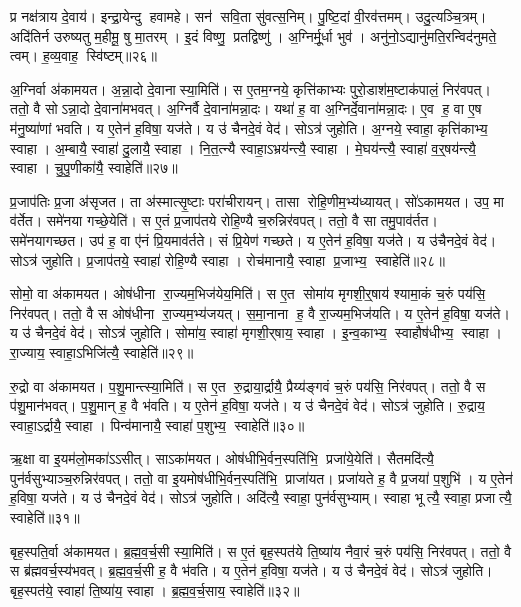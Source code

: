 प्र नक्ष॑त्राय दे॒वाय॑।
इन्द्रा॒येन्दु हवामहे।
सन॑ सवि॒ता सु॑वत्स॒निम्।
पु॒ष्टि॒दां वी॒रव॑त्तमम्।
उदु॒त्यञ्चि॒त्रम्।
अदि॑तिर्न उरुष्यतु म॒हीमू॒ षु मा॒तरम्।
इ॒दं विष्णु॒ प्रतद्विष्णु॑।
अ॒ग्निर्मू॒र्धा भुव॑।
अनु॑नो॒ऽद्यानु॑मति॒रन्विद॑नुमते॒ त्वम्।
ह॒व्य॒वाह॒ स्वि॑ष्टम्॥२६॥\anuvakamend[आ॒य॒त्य॑गम॒त्स्वि॑ष्टम्]

अ॒ग्निर्वा अ॑कामयत।
अ॒न्ना॒दो दे॒वानास्या॒मिति॑।
स ए॒तम॒ग्नये॒ कृत्ति॑काभ्यः पुरो॒डाश॑म॒ष्टाक॑पालं॒ निर॑वपत्।
ततो॒ वै सोऽन्ना॒दो दे॒वाना॑मभवत्।
अ॒ग्निर्वै दे॒वाना॑मन्ना॒दः।
यथा॑ ह॒ वा अ॒ग्निर्दे॒वाना॑मन्ना॒दः।
ए॒व ह॒ वा ए॒ष म॑नु॒ष्या॑णां भवति।
य ए॒तेन॑ ह॒विषा॒ यज॑ते।
य उ॑ चैनदे॒वं वेद॑।
सोऽत्र॑ जुहोति।
अ॒ग्नये॒ स्वाहा॒ कृत्ति॑काभ्य॒ स्वाहा।
अ॒म्बायै॒ स्वाहा॑ दु॒लायै॒ स्वाहा।
नि॒त॒त्न्यै स्वाहा॒ऽभ्रय॑न्त्यै॒ स्वाहा।
मे॒घय॑न्त्यै॒ स्वाहा॑ व॒र्॒षय॑न्त्यै॒ स्वाहा।
चु॒पु॒णीका॑यै॒ स्वाहेति॑॥२७॥

प्र॒जाप॑तिः प्र॒जा अ॑सृजत।
ता अ॑स्मात्सृ॒ष्टाः परा॑चीरायन्।
तासा रोहि॒णीम॒भ्य॑ध्यायत्।
सो॑ऽकामयत।
उप॒ मा व॑र्तेत।
समे॑नया गच्छे॒येति॑।
स ए॒तं प्र॒जाप॑तये रोहि॒ण्यै च॒रुन्निर॑वपत्।
ततो॒ वै सा तमु॒पाव॑र्तत।
समे॑नयागच्छत।
उप॑ ह॒ वा ए॑नं प्रि॒यमाव॑र्तते।
सं प्रि॒येण॑ गच्छते।
य ए॒तेन॑ ह॒विषा॒ यज॑ते।
य उ॑चैनदे॒वं वेद॑।
सोऽत्र॑ जुहोति।
प्र॒जाप॑तये॒ स्वाहा॑ रोहि॒ण्यै स्वाहा।
रोच॑मानायै॒ स्वाहा प्र॒जाभ्य॒ स्वाहेति॑॥२८॥

सोमो॒ वा अ॑कामयत।
ओष॑धीना रा॒ज्यम॒भिज॑येय॒मिति॑।
स ए॒त सोमा॑य मृगशी॒र्॒षाय॑ श्यामा॒कं च॒रुं पय॑सि॒ निर॑वपत्।
ततो॒ वै स ओष॑धीना रा॒ज्यम॒भ्य॑जयत्।
स॒मा॒नाना ह॒ वै रा॒ज्यम॒भिज॑यति।
य ए॒तेन॑ ह॒विषा॒ यज॑ते।
य उ॑ चैनदे॒वं वेद॑।
सोऽत्र॑ जुहोति।
सोमा॑य॒ स्वाहा॑ मृगशी॒र्‌षाय॒ स्वाहा।
इ॒न्व॒काभ्य॒ स्वाहौष॑धीभ्य॒ स्वाहा।
रा॒ज्याय॒ स्वाहा॒ऽभिजि॑त्यै॒ स्वाहेति॑॥२९॥

रु॒द्रो वा अ॑कामयत।
प॒शु॒मान्त्स्या॒मिति॑।
स ए॒त रु॒द्राया॒र्द्रायै॒ प्रैय्य॑ङ्गवं च॒रुं पय॑सि॒ निर॑वपत्।
ततो॒ वै स प॑शु॒मान॑भवत्।
प॒शु॒मान् ह॒ वै भ॑वति।
य ए॒तेन॑ ह॒विषा॒ यज॑ते।
य उ॑ चैनदे॒वं वेद॑।
सोऽत्र॑ जुहोति।
रु॒द्राय॒ स्वाहा॒ऽर्द्रायै॒ स्वाहा।
पिन्व॑मानायै॒ स्वाहा॑ प॒शुभ्य॒ स्वाहेति॑॥३०॥

ऋ॒क्षा वा इ॒यम॑लो॒मका॑ऽऽसीत्।
साऽका॑मयत।
ओष॑धीभि॒र्वन॒स्पति॑भि॒ प्रजा॑ये॒येति॑।
सैतमदि॑त्यै॒ पुन॑र्वसुभ्याञ्च॒रुन्निर॑वपत्।
ततो॒ वा इ॒यमोष॑धीभि॒र्वन॒स्पति॑भि॒ प्राजा॑यत।
प्रजा॑यते ह॒ वै प्र॒जया॑ प॒शुभि॑।
य ए॒तेन॑ ह॒विषा॒ यज॑ते।
य उ॑ चैनदे॒वं वेद॑।
सोऽत्र॑ जुहोति।
अदि॑त्यै॒ स्वाहा॒ पुन॑र्वसुभ्याम्।
स्वाहा भूत्यै॒ स्वाहा॒ प्रजात्यै॒ स्वाहेति॑॥३१॥

बृह॒स्पति॒र्वा अ॑कामयत।
ब्र॒ह्म॒व॒र्च॒सी स्या॒मिति॑।
स ए॒तं बृह॒स्पत॑ये ति॒ष्या॑य नैवा॒रं च॒रुं पय॑सि॒ निर॑वपत्।
ततो॒ वै स ब्र॑ह्मवर्च॒स्य॑भवत्।
ब्र॒ह्म॒व॒र्च॒सी ह॒ वै भ॑वति।
य ए॒तेन॑ ह॒विषा॒ यज॑ते।
य उ॑ चैनदे॒वं वेद॑।
सोऽत्र॑ जुहोति।
बृह॒स्पत॑ये॒ स्वाहा॑ ति॒ष्या॑य॒ स्वाहा।
ब्र॒ह्म॒व॒र्च॒साय॒ स्वाहेति॑॥३२॥


